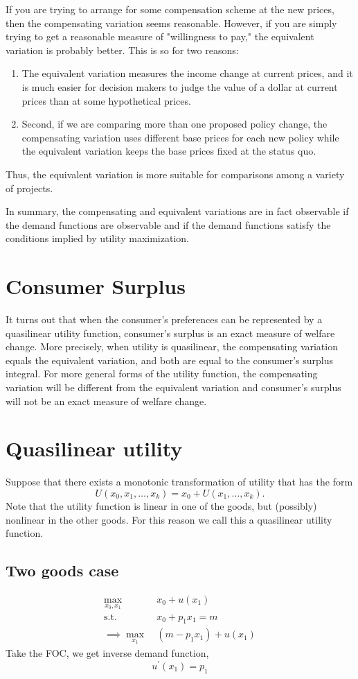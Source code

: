 If you are trying to arrange for some compensation scheme at the new prices, then the compensating variation seems reasonable. However, if you are simply trying to get a reasonable measure of "willingness to pay," the equivalent variation is probably better. This is so for two reasons:
\begin{enumerate}
    \item The equivalent variation measures the income change at current prices, and it is much easier for decision makers to judge the value of a dollar at current prices than at some hypothetical prices.
    \item Second, if we are comparing more than one proposed policy change, the compensating variation uses different base prices for each new policy while the equivalent variation keeps the base prices fixed at the status quo.
\end{enumerate}
Thus, the equivalent variation is more suitable for comparisons among a variety of projects.

In summary, the compensating and equivalent variations are in fact observable if the demand functions are observable and if the demand functions satisfy the conditions implied by utility maximization.

\section{Consumer Surplus}

It turns out that when the consumer's preferences can be represented by a quasilinear utility function, consumer's surplus is an exact measure of welfare change. More precisely, when utility is quasilinear, the compensating variation equals the equivalent variation, and both are equal to the consumer's surplus integral. For more general forms of the utility function, the compensating variation will be different from the equivalent variation and consumer's surplus will not be an exact measure of welfare change.

\section{Quasilinear utility}
Suppose that there exists a monotonic transformation of utility that has the form
\[
    U(x_0,x_1, \dots, x_k) = x_0 + U(x_1, \dots, x_k).
\]
Note that the utility function is linear in one of the goods, but (possibly) nonlinear in the other goods. For this reason we call this a quasilinear utility function.

\subsection{Two goods case}
\begin{align*}
    \underset{x_0, x_1}{\max} & \ x_0 + u(x_1) \\
    \text{s.t.} & \ x_0 + p_1x_1 = m \\
    \implies \underset{x_1}{\max} & \ (m-p_1x_1) + u(x_1)
\end{align*}
Take the FOC, we get inverse demand function,
\[
    u^\prime(x_1) = p_1
\]